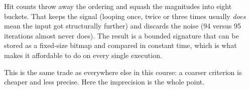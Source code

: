 \documentclass[addpoints]{exam}
\begin{document}
\begin{questions}
\begin{parts}
\begin{solution}
    Hit counts throw away the ordering and squash the magnitudes into
    eight buckets. That keeps the signal (looping once, twice or three
    times usually \emph{does} mean the input got structurally further)
    and discards the noise (94 versus 95 iterations almost never does).
    The result is a bounded signature that can be stored as a fixed-size
    bitmap and compared in constant time, which is what makes it
    affordable to do on every single execution.

    This is the same trade as everywhere else in this course: a coarser
    criterion is cheaper and less precise. Here the imprecision is the
    whole point.
  \end{solution}

\end{parts}

\end{questions}
\end{document}
